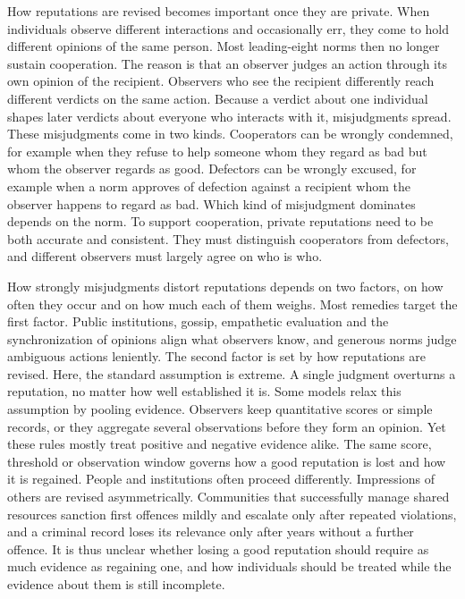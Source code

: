 \documentclass[10pt]{wlscirep}
\theoremstyle{plain}
\theoremstyle{remark}
\begin{document}
How reputations are revised becomes important once they are private. When individuals observe different interactions and occasionally err, they come to hold different opinions of the same person\cite{takahashi2006,uchida2010}. Most leading-eight norms then no longer sustain cooperation\cite{hilbe2018,okada2018,perret2021,fujimoto2023}. The reason is that an observer judges an action through its own opinion of the recipient. Observers who see the recipient differently reach different verdicts on the same action. Because a verdict about one individual shapes later verdicts about everyone who interacts with it, misjudgments spread\cite{hilbe2018,uchida2013,radzvilavicius2019}. These misjudgments come in two kinds. Cooperators can be wrongly condemned, for example when they refuse to help someone whom they regard as bad but whom the observer regards as good\cite{okada2020dilemmas,pires2025}. Defectors can be wrongly excused, for example when a norm approves of defection against a recipient whom the observer happens to regard as bad. Which kind of misjudgment dominates depends on the norm\cite{fujimoto2022,fujimoto2023}. To support cooperation, private reputations need to be both accurate and consistent. They must distinguish cooperators from defectors, and different observers must largely agree on who is who\cite{fujimoto2022,murase2024synchronization}.

How strongly misjudgments distort reputations depends on two factors, on how often they occur and on how much each of them weighs. Most remedies target the first factor. Public institutions, gossip, empathetic evaluation and the synchronization of opinions align what observers know\cite{radzvilavicius2021,kawakatsu2024,radzvilavicius2019,murase2024synchronization,tham2026}, and generous norms judge ambiguous actions leniently\cite{schmid2021,okada2024}. The second factor is set by how reputations are revised. Here, the standard assumption is extreme. A single judgment overturns a reputation, no matter how well established it is\cite{ohtsuki2004,hilbe2018}. Some models relax this assumption by pooling evidence. Observers keep quantitative scores or simple records\cite{schmid2023,clark2020,tanabe2013,murase2022,yamamoto2025}, or they aggregate several observations before they form an opinion\cite{michelmata2024}. Yet these rules mostly treat positive and negative evidence alike. The same score, threshold or observation window governs how a good reputation is lost and how it is regained. People and institutions often proceed differently. Impressions of others are revised asymmetrically\cite{skowronski1989,mendesiedlecki2013diagnostic,siegel2018}. Communities that successfully manage shared resources sanction first offences mildly and escalate only after repeated violations\cite{ostrom1990,cox2010}, and a criminal record loses its relevance only after years without a further offence\cite{blumstein2009}. It is thus unclear whether losing a good reputation should require as much evidence as regaining one, and how individuals should be treated while the evidence about them is still incomplete.
\end{document}
